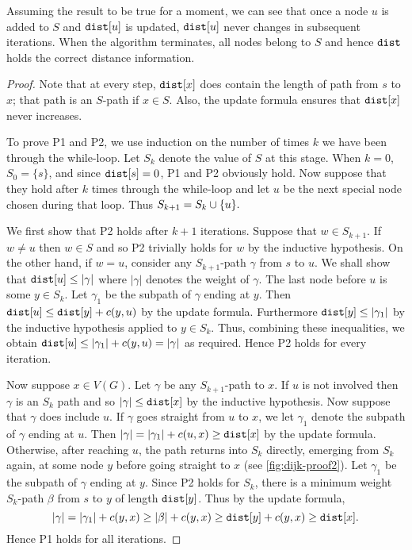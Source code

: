 \begin{note} Assuming the result to be true for a moment, we can see
that once a node $u$ is added to $S$ and $\dist[u]$ is updated, $\dist[u]$
never changes in subsequent iterations. When the algorithm terminates,
all nodes belong to $S$ and hence $\dist$ holds the correct distance information.
\end{note}
\begin{proof} 
Note that at every step, $\dist[x]$ does contain
the length of  path from $s$ to $x$; that path is an
$S$-path if $x\in S$. Also, the update formula ensures that $\dist[x]$
never increases. 

To prove P1 and P2, we use induction on the number of times $k$ we
have been through the while-loop. Let $S_k$ denote the value of $S$
at this stage. When $k=0$, $S_0=\{s\}$, and since $\dist[s]=0$, P1 and
P2 obviously hold. Now suppose that they hold after $k$ times through
the while-loop and let $u$ be the next special node chosen during that
loop. Thus $S_{k+1} = S_k \cup \mbox{$\{u\}$}.$

We first show that P2 holds after $k+1$ iterations. Suppose that
$w\in S_{k+1}$.  If $w\neq u$ then $w\in S$ and so P2 trivially
holds for $w$ by the inductive hypothesis. On the other hand,
if $w=u$, consider any $S_{k+1}$-path $\gamma$ from $s$ to $u$.
We shall show that $\dist[u] \leq
|\gamma |$ where $| \gamma | $ denotes the weight of $\gamma$. The
last node before $u$ is some $y\in S_k$. Let $\gamma_1$ be the subpath
of $\gamma$ ending at $y$. Then $\dist[u] \leq \dist[y] + c(y,u)$ by the
update formula. Furthermore $\dist[y] \leq |\gamma_1 |$ by the inductive
hypothesis applied to $y\in S_k$. Thus, combining these inequalities,
we obtain $\dist[u] \leq |\gamma_1 | + c(y, u) = | \gamma |$ as
required. Hence P2 holds for every iteration.

Now suppose $x\in V(G)$. Let $\gamma$ be any $S_{k+1}$-path to $x$. If
$u$ is not involved then $\gamma$ is an $S_k$ path and so $|\gamma| \leq
\dist[x]$ by the inductive hypothesis. Now suppose that $\gamma$ does
include $u$. 
If $\gamma$ goes straight from $u$ to $x$, we let $\gamma_1$ denote the 
subpath of $\gamma$ ending at $u$. Then $|\gamma| = |\gamma_1| + c(u,x) \geq 
\dist[x]$ by the update formula. 
Otherwise, after reaching $u$, the path returns into $S_k$
directly, emerging from $S_k$ again, at some node $y$ before going
straight to $x$ (see \cref{fig:dijk-proof2}). Let $\gamma_1$
be the subpath of $\gamma$ ending at $y$. Since P2 holds for $S_k$,
there is a minimum weight $S_k$-path $\beta$ from $s$ to $y$ of length
$\dist[y]$. Thus by the update formula, 
$$
|\gamma| = |\gamma_1| + c(y,
x) \geq |\beta| + c(y, x) \geq \dist[y] + c(y, x) \geq \dist[x].
$$ 
Hence P1 holds for all iterations.
\end{proof}

